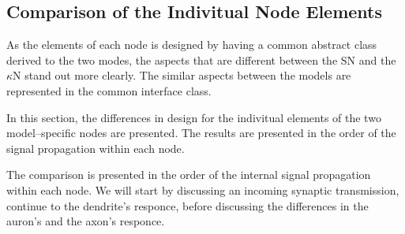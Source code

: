 
	
	\subsection{Comparison of the Indivitual Node Elements}
				
	As the elements of each node is designed by having a common abstract class derived to the two modes, the aspects that are different between the SN and the $\kappa$N stand out more clearly.
	The similar aspects between the models are represented in the common interface class.

	In this section, the differences in design for the indivitual elements of the two model--specific nodes are presented. %
	The results are presented in the order of the signal propagation within each node.
	
	The comparison is presented in the order of the internal signal propagation within each node.
	We will start by discussing an incoming synaptic transmission, continue to the dendrite's responce, before discussing the differences in the auron's and the axon's responce.

